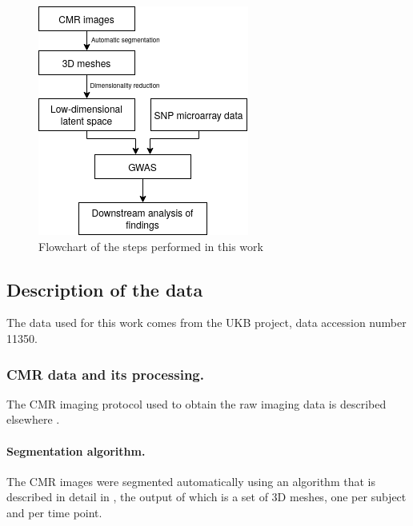 \documentclass[twocolumn]{llncs}
\newcommand{\ACCESSIONNUMBER}{11350}
\begin{document}
\begin{figure}
\centering
\includegraphics[width=0.8\linewidth]{figs/workflow.png} 
\caption{Flowchart of the steps performed in this work}
\label{fig:workflow}
\end{figure}

\subsection{Description of the data}
The data used for this work comes from the UKB project, data accession number \ACCESSIONNUMBER.

\subsubsection{CMR data and its processing.}
The CMR imaging protocol used to obtain the raw imaging data is described elsewhere \cite{ref_ukbb_cmr}. 

\paragraph{Segmentation algorithm.}
The CMR images were segmented automatically using an algorithm that is described in detail in \cite{ref_rahman}, the output of which is a set of 3D meshes, one per subject and per time point.
\end{document}
